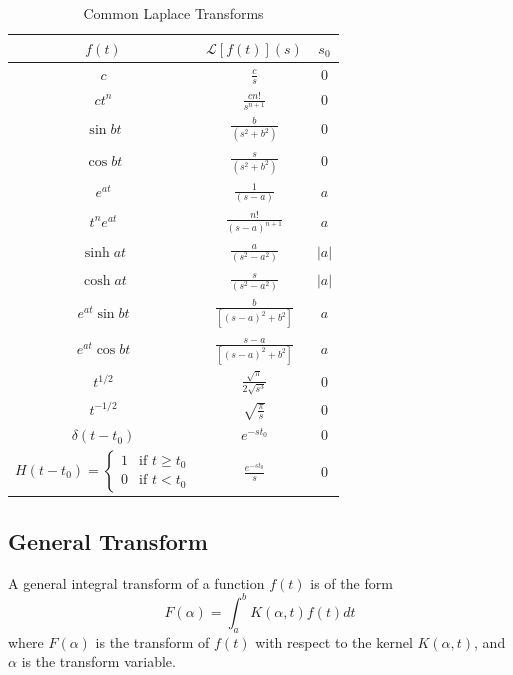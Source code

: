 \documentclass[12pt, a4paper, oneside, openright, titlepage]{book}
\begin{document}
\begin{table}[H]
    \centering
    \caption{Common Laplace Transforms}
    \begin{tabular}{ccc}
        \hline
        $f(t)$ & $\mathcal{L}[f(t)](s)$ & $s_0$ \\ \hline \hline
        $c$ & $\frac{c}{s}$ & $0$ \\ 
        $ct^n$ & $\frac{cn!}{s^{n+1}}$ & $0$ \\
        $\sin bt$ & $\frac{b}{(s^2+b^2)}$ & $0$ \\
        $\cos bt$ & $\frac{s}{(s^2+b^2)}$ & $0$ \\
        $e^{at}$ & $\frac{1}{(s-a)}$ & $a$ \\
        $t^ne^{at}$ & $\frac{n!}{(s-a)^{n+1}}$ & $a$ \\
        $\sinh at$ & $\frac{a}{(s^2-a^2)}$ & $|a|$ \\
        $\cosh at$ & $\frac{s}{(s^2-a^2)}$ & $|a|$ \\
        $e^{at}\sin bt$ & $\frac{b}{[(s-a)^2+b^2]}$ & $a$ \\
        $e^{at}\cos bt$ & $\frac{s-a}{[(s-a)^2+b^2]}$ & $a$ \\
        $t^{1/2}$ & $ \frac{\sqrt{\pi}}{2\sqrt{s^3}}$ & $0$ \\
        $t^{-1/2}$ & $\sqrt{\frac{\pi}{s}}$ & $0$ \\
        $\delta(t-t_0)$ & $e^{-st_0}$ & $0$ \\
        $H(t-t_0) = \left\{\begin{array}{lc} 1 & \text{if } t\geq t_0 \\ 0 & \text{if } t < t_0\end{array}\right.$ & $\frac{e^{-st_0}}{s}$ & $0$ \\ \hline \hline
    \end{tabular}
\end{table}

\subsection{General Transform}

\begin{defn}
    A general integral transform of a function $f(t)$ is of the form \begin{equation}
        F(\alpha) = \int_a^bK(\alpha,t)f(t)dt
    \end{equation}
    where $F(\alpha)$ is the transform of $f(t)$ with respect to the kernel $K(\alpha, t)$, and $\alpha$ is the transform variable.
\end{defn}
\end{document}

